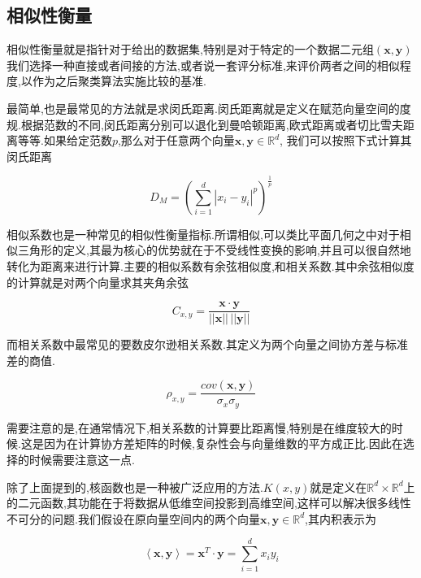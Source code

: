 \subsection{相似性衡量}
\label{subsec:similarity}

相似性衡量就是指针对于给出的数据集,特别是对于特定的一个数据二元组$(\mathbf{x},\mathbf{y} )$我们选择一种直接或者间接的方法,或者说一套评分标准,来评价两者之间的相似程度,以作为之后聚类算法实施比较的基准.

最简单,也是最常见的方法就是求闵氏距离.闵氏距离就是定义在赋范向量空间的度规.根据范数的不同,闵氏距离分别可以退化到曼哈顿距离,欧式距离或者切比雪夫距离等等.如果给定范数$p$,那么对于任意两个向量$\mathbf{x}, \mathbf{y} \in \mathbb{R}^{d}$, 我们可以按照下式计算其闵氏距离

\begin{equation}
	D_{M} = \left(\sum_{i=1}^{d}|x_i - y_i|^p\right)^{\frac{1}{p}}
\end{equation}

相似系数也是一种常见的相似性衡量指标.所谓相似,可以类比平面几何之中对于相似三角形的定义,其最为核心的优势就在于不受线性变换的影响,并且可以很自然地转化为距离来进行计算.主要的相似系数有余弦相似度,和相关系数.其中余弦相似度的计算就是对两个向量求其夹角余弦

\begin{equation}
	C_{x,y} = \frac{\mathbf{x} \cdot \mathbf{y}}{||\mathbf{x}||\,||\mathbf{y}||}
\end{equation}

而相关系数中最常见的要数皮尔逊相关系数.其定义为两个向量之间协方差与标准差的商值.

\begin{equation}
	\rho_{x,y} = \frac{cov(\mathbf{x}, \mathbf{y})}{\sigma_x \sigma_y}
\end{equation}

需要注意的是,在通常情况下,相关系数的计算要比距离慢,特别是在维度较大的时候.这是因为在计算协方差矩阵的时候,复杂性会与向量维数的平方成正比.因此在选择的时候需要注意这一点.

除了上面提到的,核函数也是一种被广泛应用的方法.$K(x,y)$就是定义在$\mathbb{R}^d \times \mathbb{R}^d$上的二元函数,其功能在于将数据从低维空间投影到高维空间,这样可以解决很多线性不可分的问题.我们假设在原向量空间内的两个向量$\mathbf{x},\mathbf{y} \in \mathbb{R}^d$,其内积表示为

\begin{equation}
	\left<\mathbf{x}, \mathbf{y}\right> = \mathbf{x}^T \cdot \mathbf{y} = \sum_{i=1}^{d} x_iy_i
\end{equation}


